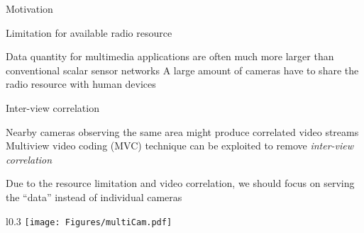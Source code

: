 \begin{frame}{Motivation}
%
\begin{itemize}
	\myItem Limitation for available radio resource
	\begin{itemize}
		\mySubItem Data quantity for multimedia applications are often much more larger than conventional scalar sensor networks
		\mySubItem A large amount of cameras have to share the radio resource with human devices
	\end{itemize}
	\myItem Inter-view correlation
	\begin{itemize}
		\mySubItem Nearby cameras observing the same area might produce correlated video streams
		\mySubItem Multiview video coding (MVC) technique can be exploited to remove \emph{inter-view correlation}
	\end{itemize}
	\myItem Due to the resource limitation and video correlation, we should focus on serving the ``data'' instead of individual cameras
\end{itemize}
%
	\begin{wrapfigure}{l}{0.3\textwidth}
		\centering
		\texttt{[image: Figures/multiCam.pdf]}
	\end{wrapfigure}
%
\end{frame}
